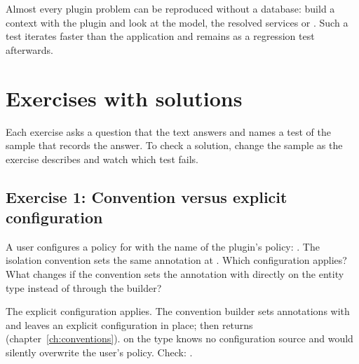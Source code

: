 \begin{tip}
  Almost every plugin problem can be reproduced without a database: build a context with the
  plugin and look at the model, the resolved services or
  . Such a test iterates faster
  than the application and remains as a regression test afterwards.
\end{tip}

\chapter{Exercises with solutions}\label{app:E}

Each exercise asks a question that the text answers and names a test of the sample that records
the answer. To check a solution, change the sample as the exercise describes and watch which test
fails.

\section{Exercise 1: Convention versus explicit configuration}

A user configures a policy for  with the name of the plugin's policy:
. The isolation
convention sets the same annotation at . Which configuration
applies? What changes if the convention sets the annotation with
 directly on the entity type instead of through the builder?

\begin{note}[Solution]
  The explicit configuration applies. The convention builder sets annotations with
   and leaves an explicit
  configuration in place;  then returns 
  (chapter~\ref{ch:conventions}).  on the type knows no
  configuration source and would silently overwrite the user's policy.
  Check: .
\end{note}

